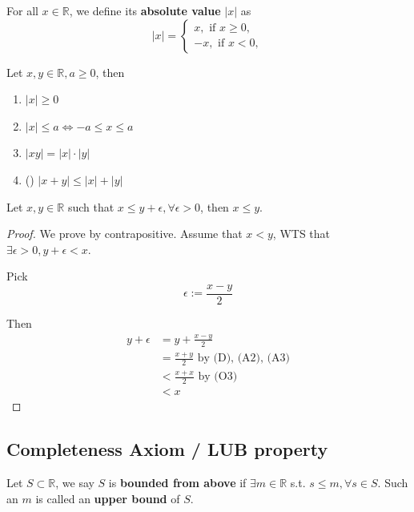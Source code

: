 
\begin{definition}
    For all $x \in \mathbb{R}$, we define its \textbf{absolute value} $|x|$ as 
    \[
        \left| x \right| = 
        \begin{cases}
            x, \text{ if } x \geq 0,\\
            -x, \text{ if } x < 0,
        \end{cases}
    \]
    
\end{definition}

\begin{proposition}
    Let $x, y \in \mathbb{R}, a \geq 0$, then 
    \begin{enumerate}
        \item $|x| \geq 0$
        \item $|x| \leq a \iff -a \leq x \leq a$
        \item $|xy| = |x| \cdot |y|$
        \item () $|x + y| \leq |x| + |y|$
    \end{enumerate}
\end{proposition}

\begin{proposition}
    Let $x, y \in \mathbb{R}$ such that $x \leq y + \epsilon, \forall \epsilon > 0$, then $x \leq y$.
\end{proposition}

\begin{proof}
    We prove by contrapositive. Assume that $x < y$, WTS that $\exists \epsilon > 0, y + \epsilon < x$.
    \medskip

    Pick 
    \[
        \epsilon := \frac{x - y}{2}
    \]
    
    Then 
    \begin{align*}
        y + \epsilon &= y + \frac{x - y}{2} \\
        &= \frac{x+y}{2} \text{ by (D), (A2), (A3)} \\
        & < \frac{x + x}{2} \text{ by (O3)} \\
        & < x
    \end{align*}
\end{proof}

\subsection{Completeness Axiom / LUB property}

\begin{definition}
    Let $S \subset \mathbb{R}$, we say $S$ is \textbf{bounded from above} 
    if $\exists m \in \mathbb{R}$ s.t. $s \leq m, \forall s \in S$. 
    Such an $m$ is called an \textbf{upper bound} of $S$.
\end{definition}

